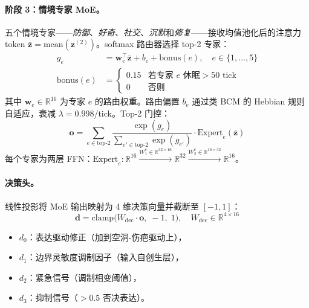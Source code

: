 \documentclass[11pt]{article}
\begin{document}
\paragraph{阶段 3：情境专家 MoE。}
五个情境专家——\emph{防御}、\emph{好奇}、\emph{社交}、\emph{沉默}和\emph{修复}——接收均值池化后的注意力 token $\bar{\mathbf{z}} = \text{mean}(\mathbf{z}^{(2)})$。softmax 路由器选择 top-2 专家：
\begin{align}
g_e &= \mathbf{w}_e^\top \bar{\mathbf{z}} + b_e + \text{bonus}(e), \quad e \in \{1,\ldots,5\} \\
\text{bonus}(e) &= \begin{cases} 0.15 & \text{若专家 } e \text{ 休眠} > 50 \text{ tick} \\ 0 & \text{否则} \end{cases}
\end{align}
其中 $\mathbf{w}_e \in \mathbb{R}^{16}$ 为专家 $e$ 的路由权重。路由偏置 $b_e$ 通过类 BCM 的 Hebbian 规则自适应，衰减 $\lambda = 0.998$/tick。Top-2 门控：
\begin{equation}
\mathbf{o} = \sum_{e \in \text{top-2}} \frac{\exp(g_e)}{\sum_{e' \in \text{top-2}} \exp(g_{e'})} \cdot \text{Expert}_e(\bar{\mathbf{z}})
\end{equation}
每个专家为两层 FFN：$\text{Expert}_e: \mathbb{R}^{16} \xrightarrow{W_1^e \in \mathbb{R}^{32 \times 16}} \mathbb{R}^{32} \xrightarrow{W_2^e \in \mathbb{R}^{16 \times 32}} \mathbb{R}^{16}$。

\paragraph{决策头。}
线性投影将 MoE 输出映射为 4 维决策向量并截断至 $[-1, 1]$：
\begin{equation}
\mathbf{d} = \text{clamp}\bigl(W_{\text{dec}} \cdot \mathbf{o},\; -1,\; 1\bigr), \quad W_{\text{dec}} \in \mathbb{R}^{4 \times 16}
\end{equation}
\begin{itemize}
\item $d_0$：表达驱动修正（加到空洞-伤疤驱动上），
\item $d_1$：边界灵敏度调制因子（输入自创生层），
\item $d_2$：紧急信号（调制相变阈值），
\item $d_3$：抑制信号（$> 0.5$ 否决表达）。
\end{itemize}
\end{document}
